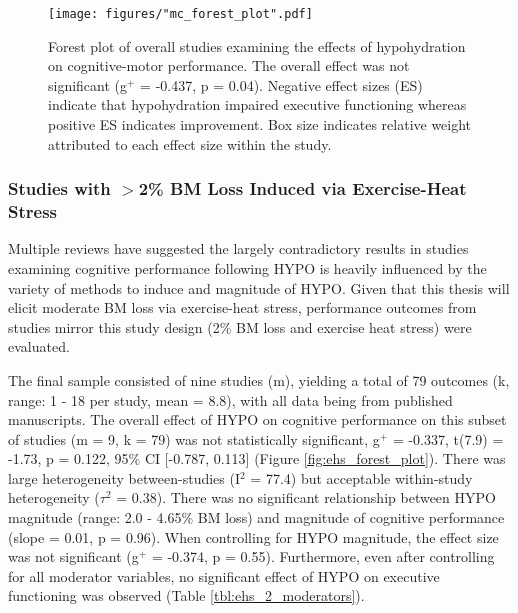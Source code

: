 \begin{figure}
	\texttt{[image: figures/"mc\_forest\_plot".pdf]}
	\caption{Forest plot of overall studies examining the effects of hypohydration on cognitive-motor performance. The overall effect was not significant (g${^+}$ = -0.437, p = 0.04). Negative effect sizes (ES) indicate that hypohydration impaired executive functioning whereas positive ES indicates improvement. Box size indicates relative weight attributed to each effect size within the study.}
	\label{fig:mc_forest}
\end{figure}

\subsubsection{Studies with ${>}$2\% BM Loss Induced via Exercise-Heat Stress}
Multiple reviews \cite{lieberman_hydration_2007,lieberman_methods_2012} have suggested the largely contradictory results in studies examining cognitive performance following HYPO is heavily influenced by the variety of methods to induce and magnitude of HYPO. Given that this thesis will elicit moderate BM loss via exercise-heat stress, performance outcomes from studies mirror this study design (2\% BM loss and exercise heat stress) were evaluated.

The final sample consisted of nine studies (m), yielding a total of 79 outcomes (k, range: 1 - 18 per study, mean = 8.8), with all data being from published manuscripts. The overall effect of HYPO on cognitive performance on this subset of studies (m = 9, k = 79) was not statistically significant, g${^+}$ =  -0.337, t(7.9) = -1.73, p = 0.122, 95\% CI [-0.787, 0.113] (Figure \ref{fig:ehs_forest_plot}). There was large heterogeneity between-studies (I${^2}$ = 77.4) but acceptable within-study heterogeneity (${\tau}$${^2}$ = 0.38). There was no significant relationship between HYPO magnitude (range: 2.0 - 4.65\% BM loss) and magnitude of cognitive performance (slope = 0.01, p = 0.96). When controlling for HYPO magnitude, the effect size was not significant (g${^+}$ =  -0.374, p = 0.55). Furthermore, even after controlling for all moderator variables, no significant effect of HYPO on executive functioning was observed (Table \ref{tbl:ehs_2_moderators}). 

